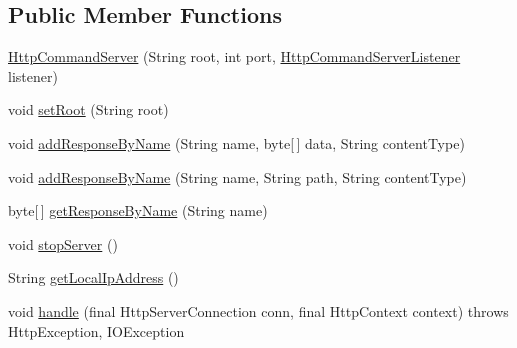\subsection*{Public Member Functions}
\begin{DoxyCompactItemize}
\item 
\hyperlink{classcom_1_1cellbots_1_1httpserver_1_1_http_command_server_af6ff32ff0ae04008b28b8164109fed10}{Http\-Command\-Server} (String root, int port, \hyperlink{interfacecom_1_1cellbots_1_1httpserver_1_1_http_command_server_1_1_http_command_server_listener}{Http\-Command\-Server\-Listener} listener)
\item 
void \hyperlink{classcom_1_1cellbots_1_1httpserver_1_1_http_command_server_a7c06210fd4e74e9820a86d80ba5034b2}{set\-Root} (String root)
\item 
void \hyperlink{classcom_1_1cellbots_1_1httpserver_1_1_http_command_server_a019f90136a63a63ee7b85be84c6ad2a8}{add\-Response\-By\-Name} (String name, byte\mbox{[}$\,$\mbox{]} data, String content\-Type)
\item 
void \hyperlink{classcom_1_1cellbots_1_1httpserver_1_1_http_command_server_a32f6851c312b3f8d4746f84cbae32adb}{add\-Response\-By\-Name} (String name, String path, String content\-Type)
\item 
byte\mbox{[}$\,$\mbox{]} \hyperlink{classcom_1_1cellbots_1_1httpserver_1_1_http_command_server_ab8ccb7f93a2c889a3920496ebb544ade}{get\-Response\-By\-Name} (String name)
\item 
void \hyperlink{classcom_1_1cellbots_1_1httpserver_1_1_http_command_server_a7bf03172ef4fbc88a23f56d29ff74cff}{stop\-Server} ()
\item 
String \hyperlink{classcom_1_1cellbots_1_1httpserver_1_1_http_command_server_a26b517cf4b436c4a4fb75e42b1ef9ece}{get\-Local\-Ip\-Address} ()
\item 
void \hyperlink{classcom_1_1cellbots_1_1httpserver_1_1_http_command_server_a2370a07c31c49c29c0e726410e480c5d}{handle} (final Http\-Server\-Connection conn, final Http\-Context context)  throws Http\-Exception, I\-O\-Exception 
\end{DoxyCompactItemize}


